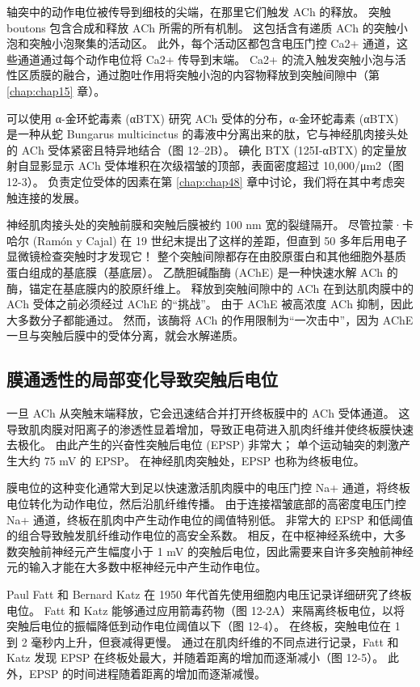 轴突中的动作电位被传导到细枝的尖端，在那里它们触发 ACh 的释放。 
突触 boutons 包含合成和释放 ACh 所需的所有机制。 
这包括含有递质 ACh 的突触小泡和突触小泡聚集的活动区。 
此外，每个活动区都包含电压门控 Ca2+ 通道，这些通道通过每个动作电位将 Ca2+ 传导到末端。 
Ca2+ 的流入触发突触小泡与活性区质膜的融合，通过胞吐作用将突触小泡的内容物释放到突触间隙中（第 \ref{chap:chap15} 章）。


可以使用 α-金环蛇毒素 (αBTX) 研究 ACh 受体的分布，α-金环蛇毒素 (αBTX) 是一种从蛇 Bungarus multicinctus 的毒液中分离出来的肽，它与神经肌肉接头处的 ACh 受体紧密且特异地结合（图 12–2B）。 
碘化 BTX (125I-αBTX) 的定量放射自显影显示 ACh 受体堆积在次级褶皱的顶部，表面密度超过 10,000/μm2（图 12-3）。 
负责定位受体的因素在第 \ref{chap:chap48} 章中讨论，我们将在其中考虑突触连接的发展。


神经肌肉接头处的突触前膜和突触后膜被约 100 nm 宽的裂缝隔开。 
尽管拉蒙·卡哈尔 (Ramón y Cajal) 在 19 世纪末提出了这样的差距，但直到 50 多年后用电子显微镜检查突触时才发现它！ 
整个突触间隙都存在由胶原蛋白和其他细胞外基质蛋白组成的基底膜（基底层）。 
乙酰胆碱酯酶 (AChE) 是一种快速水解 ACh 的酶，锚定在基底膜内的胶原纤维上。 
释放到突触间隙中的 ACh 在到达肌肉膜中的 ACh 受体之前必须经过 AChE 的“挑战”。 
由于 AChE 被高浓度 ACh 抑制，因此大多数分子都能通过。 
然而，该酶将 ACh 的作用限制为“一次击中”，因为 AChE 一旦与突触后膜中的受体分离，就会水解递质。



\subsection{膜通透性的局部变化导致突触后电位}
一旦 ACh 从突触末端释放，它会迅速结合并打开终板膜中的 ACh 受体通道。 
这导致肌肉膜对阳离子的渗透性显着增加，导致正电荷进入肌肉纤维并使终板膜快速去极化。 
由此产生的兴奋性突触后电位 (EPSP) 非常大； 
单个运动轴突的刺激产生大约 75 mV 的 EPSP。
在神经肌肉突触处，EPSP 也称为终板电位。


膜电位的这种变化通常大到足以快速激活肌肉膜中的电压门控 Na+ 通道，将终板电位转化为动作电位，然后沿肌纤维传播。 
由于连接褶皱底部的高密度电压门控 Na+ 通道，终板在肌肉中产生动作电位的阈值特别低。 
非常大的 EPSP 和低阈值的组合导致触发肌纤维动作电位的高安全系数。 
相反，在中枢神经系统中，大多数突触前神经元产生幅度小于 1 mV 的突触后电位，因此需要来自许多突触前神经元的输入才能在大多数中枢神经元中产生动作电位。


Paul Fatt 和 Bernard Katz 在 1950 年代首先使用细胞内电压记录详细研究了终板电位。 
Fatt 和 Katz 能够通过应用箭毒药物（图 12-2A）来隔离终板电位，以将突触后电位的振幅降低到动作电位阈值以下（图 12-4）。 
在终板，突触电位在 1 到 2 毫秒内上升，但衰减得更慢。 
通过在肌肉纤维的不同点进行记录，Fatt 和 Katz 发现 EPSP 在终板处最大，并随着距离的增加而逐渐减小（图 12-5）。 
此外，EPSP 的时间进程随着距离的增加而逐渐减慢。


